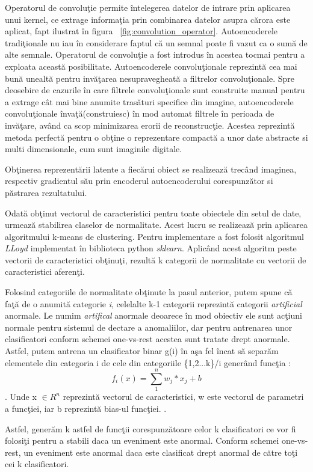 \documentclass[a4paper,12pt]{report}
\begin{document}
Operatorul de convoluţie permite întelegerea datelor de intrare prin aplicarea unui kernel, ce extrage informaţia prin combinarea datelor asupra cărora este aplicat, fapt ilustrat în figura ~\ref{fig:convolution_operator}. Autoencoderele tradiţionale nu iau în considerare faptul că un semnal poate fi vazut ca o sumă de alte semnale. Operatorul de convoluţie a fost introdus în acestea tocmai pentru a exploata această posibilitate.  Autoencoderele convoluţionale reprezintă cea mai bună unealtă pentru invăţarea nesupravegheată a filtrelor convoluţionale. Spre deosebire de cazurile în care filtrele convoluţionale sunt construite manual pentru a extrage cât mai bine anumite trasături specifice din imagine, autoencoderele convoluţionale învaţă(construiesc) în mod automat filtrele în perioada de invăţare, având ca scop minimizarea erorii de reconstrucţie. Acestea reprezintă metoda perfectă pentru o obţine o reprezentare compactă a unor date abstracte si multi dimensionale, cum sunt imaginile digitale.\cite{goodfellow2016}
\par Obţinerea reprezentării latente a fiecărui obiect se realizează trecând imaginea, respectiv gradientul său prin encoderul autoencoderului corespunzător si păstrarea rezultatului.
\par Odată obţinut vectorul de caracteristici pentru toate obiectele din setul de date, urmează stabilirea claselor de normalitate. Acest lucru se realizează prin aplicarea algoritmului k-means de clustering. Pentru implementare a fost folosit algoritmul \emph{LLoyd} implementat în biblioteca python \emph{sklearn}. Aplicând acest algoritm peste vectorii de caracteristici obţinuţi, rezultă k categorii de normalitate cu vectorii de caracteristici aferenţi. 
\par Folosind categoriile de normalitate obţinute la pasul anterior, putem spune că faţă de o anumită categorie \emph{i}, celelalte k-1 categorii reprezintă categorii \emph{artificial} anormale. Le numim \emph{artifical} anormale deoarece în mod obiectiv ele sunt acţiuni normale pentru sistemul de dectare a anomaliilor, dar pentru antrenarea unor clasificatori conform schemei one-vs-rest acestea sunt tratate drept anormale. Astfel, putem antrena un clasificator binar g(i) în aşa fel încat să separăm elementele din categoria i de cele din categoriile \{1,2...k\}/i 
generând funcţia : \[f_{i}(x) = \sum_{1}^{n} w_{j} * x_{j} + b\]. Unde x \(\in{R}^n\) reprezintă vectorul de caracteristici, w este vectorul de parametri a funcţiei, iar b reprezintă bias-ul funcţiei. \cite{ionescu2019object}.
\par Astfel, generăm k astfel de funcţii corespunzătoare celor k clasificatori ce vor fi folosiţi pentru a stabili daca un eveniment este anormal. Conform schemei one-vs-rest, un eveniment este anormal daca este clasificat drept anormal de către toţi cei k clasificatori.
\vfill
\end{document}
